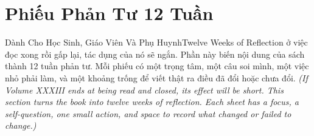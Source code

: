 \chapter*{Phiếu Phản Tư 12 Tuần}

\begin{truyen}{Dành Cho Học Sinh, Giáo Viên Và Phụ Huynh}{Twelve Weeks of Reflection}
 ở việc đọc xong rồi gấp lại, tác dụng của nó sẽ ngắn. Phần này biến nội dung của sách thành 12 tuần phản tư. Mỗi phiếu có một trọng tâm, một câu soi mình, một việc nhỏ phải làm, và một khoảng trống để viết thật ra điều đã đổi hoặc chưa đổi.
\textit{(If Volume XXXIII ends at being read and closed, its effect will be short. This section turns the book into twelve weeks of reflection. Each sheet has a focus, a self-question, one small action, and space to record what changed or failed to change.)}
\end{truyen}

\newcommand{\phieuphan}[4]{%
  \begin{tcolorbox}[
    colback=white,
    colframe=bookprimary!55,
    arc=4pt,
    boxrule=0.8pt,
    title={#1},
    fonttitle=\bfseries,
    breakable,
    enhanced
  ]
  \textbf{Trọng tâm:} #2

  \vspace{0.2cm}
  \textbf{Tự hỏi:} #3

  \vspace{0.2cm}
  \textbf{Việc nhỏ phải làm trong tuần:} #4

  \vspace{0.3cm}
  \textit{Điều tôi đã làm được:}

  \vspace{0.25cm}
  \hrulefill

  \vspace{0.35cm}
  \hrulefill

  \vspace{0.35cm}
  \textit{Điều tôi còn chống chế hoặc chưa vượt qua:}

  \vspace{0.25cm}
  \hrulefill

  \vspace{0.35cm}
  \hrulefill

  \vspace{0.35cm}
  \textit{Một người có thể nhắc tôi giữ lời tuần này: \hrulefill}
  \end{tcolorbox}
  \vspace{0.45cm}
}

